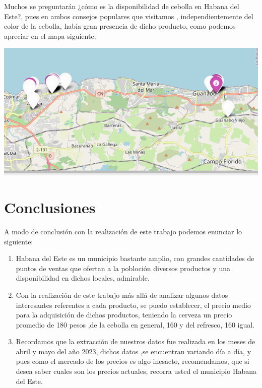 \documentclass[a4paper,11pt]{article}
\begin{document}
\par\vspace{2pt}
Muchos se preguntarán ¿cómo es la disponibilidad de cebolla en Habana del Este?, pues en ambos consejos populares que visitamos , independientemente del color de la cebolla, había gran presencia de dicho producto, como podemos apreciar en el mapa siguiente.
\par\vspace{2pt}
\begin{minipage}{0.5\textwidth}
  \begin{center}
    \includegraphics[width=1.4\textwidth]{mapa de cebolla.png}
  \end{center}
\end{minipage}


\newpage

\section{Conclusiones}
A modo de conclusión con la realización de este trabajo podemos enunciar lo siguiente:
\begin{enumerate}
  \item Habana del Este es un municipio bastante amplio, con grandes cantidades de puntos de ventas que ofertan a la pobloción diversos productos y una disponibilidad en dichos locales, admirable.
  \item Con la realización de este trabajo más allá de analizar algunos datos interesantes referentes a cada producto, se puedo establecer, el precio medio para la adquisición de dichos productos, teniendo la cerveza un precio promedio de 180 pesos ,de la cebolla en general, 160 y del refresco, 160 igual.  
  \item Recordamos que la extracción de nuestros datos fue realizada en los meses de abril y  mayo del año 2023, dichos datos ,se encuentran variando día a día, y pues como el mercado de los precios es algo inesacto, recomendamos, que si desea saber cuales son los precios actuales, recorra usted el municipio Habana del Este.
\end{enumerate}
\end{document}
